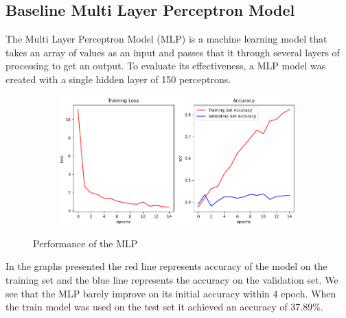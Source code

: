 \documentclass[../main.tex]{subfiles}
\begin{document}
\subsection{Baseline Multi Layer Perceptron Model}

The Multi Layer Perceptron Model (MLP) is a machine learning model that takes an array of values as an input and passes that it through several layers of processing to get an output. To evaluate its effectiveness, a MLP model was created with a single hidden layer of 150 perceptrons. 

\begin{figure}[h!]
  \centering
  \begin{subfigure}[b]{0.7\linewidth}
    \includegraphics[width=\linewidth]{mlp-performance.png}
  \end{subfigure}
  \caption{Performance of the MLP}
  \label{fig:mlp-validation}
\end{figure}

In the graphs presented the red line represents accuracy of the model on the training set and the blue line represents the accuracy on the validation set. We see that the MLP barely improve on its initial accuracy within 4 epoch. When the train model was used on the test set it achieved an accuracy of 37.89\%. 
\end{document}
